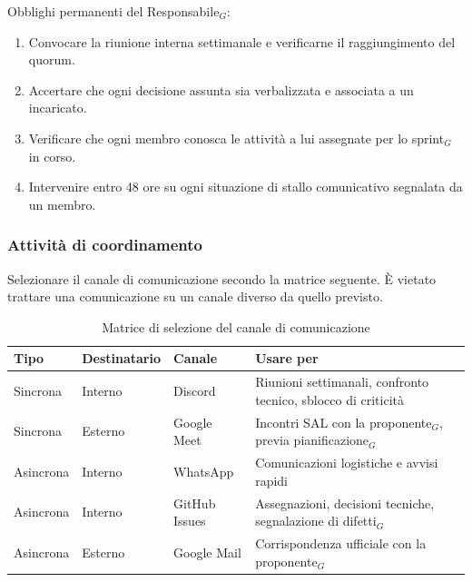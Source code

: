 \documentclass[a4paper, 10pt]{article}
\renewcommand{\arraystretch}{1.2}
\begin{document}
\noindent Obblighi permanenti del Responsabile$_G$:
\begin{enumerate}
    \item Convocare la riunione interna settimanale e verificarne il raggiungimento del quorum.
    \item Accertare che ogni decisione assunta sia verbalizzata e associata a un incaricato.
    \item Verificare che ogni membro conosca le attività a lui assegnate per lo sprint$_G$ in corso.
    \item Intervenire entro 48 ore su ogni situazione di stallo comunicativo segnalata da un membro.
\end{enumerate}

\subsubsection{Attività di coordinamento}
\label{subsubsec:attivita_coordinamento}

Selezionare il canale di comunicazione secondo la matrice seguente. È vietato trattare una comunicazione su un canale diverso da quello previsto.

\begin{table}[H]
    \centering
    \renewcommand{\arraystretch}{1.3}
    \begin{tabularx}{\textwidth}{|l|l|l|L|}
        \hline
        \textbf{Tipo} & \textbf{Destinatario} & \textbf{Canale} & \textbf{Usare per} \\
        \hline
        Sincrona & Interno & Discord & Riunioni settimanali, confronto tecnico, sblocco di criticità \\ \hline
        Sincrona & Esterno & Google Meet & Incontri SAL con la proponente$_G$, previa pianificazione$_G$ \\ \hline
        Asincrona & Interno & WhatsApp & Comunicazioni logistiche e avvisi rapidi \\ \hline
        Asincrona & Interno & GitHub Issues & Assegnazioni, decisioni tecniche, segnalazione di difetti$_G$ \\ \hline
        Asincrona & Esterno & Google Mail & Corrispondenza ufficiale con la proponente$_G$ \\ \hline
    \end{tabularx}
    \caption{Matrice di selezione del canale di comunicazione}
\end{table}
\end{document}
